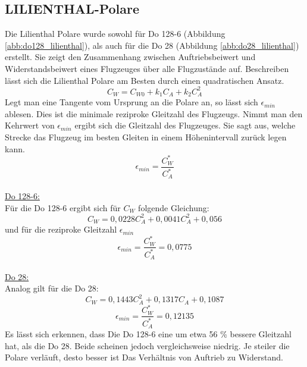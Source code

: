 \subsection{LILIENTHAL-Polare}
Die Lilienthal Polare wurde sowohl für Do 128-6 (Abbildung \ref{abb:do128_lilienthal}), als auch für die Do 28 (Abbildung \ref{abb:do28_lilienthal}) erstellt. Sie zeigt den Zusammenhang zwischen Auftriebsbeiwert und Widerstandsbeiwert eines Flugzeuges über alle Flugzustände auf. 
Beschreiben lässt sich die Lilienthal Polare am Besten durch einen quadratischen Ansatz.
\begin{equation}  \label{eq:theorie_cw}
C_W = C_{W0} + k_1 C_A + k_2 C_A^2
\end{equation}
Legt man eine Tangente vom Ursprung an die Polare an, so lässt sich $\epsilon_{min}$ ablesen. Dies ist die minimale reziproke Gleitzahl des Flugzeugs. Nimmt man den Kehrwert von $\epsilon_{min}$ ergibt sich die Gleitzahl des Flugzeuges. Sie sagt aus, welche Strecke das Flugzeug im besten Gleiten in einem Höhenintervall zurück legen kann. 
\begin{equation}
\epsilon_{min}=\frac{C_W^*}{C_A^*}
\end{equation} \\
\underline{Do 128-6:} \\
Für die Do 128-6 ergibt sich für $C_W$ folgende Gleichung:
\begin{equation}
C_W=0,0228 C_A^2 + 0,0041 C_A^2+ 0,056
\end{equation}
und für die reziproke Gleitzahl $\epsilon_{min}$
\begin{equation}
\epsilon_{min}=\frac{C_W^*}{C_A^*}=0,0775
\end{equation}
 \\
\underline{Do 28:} \\
Analog gilt für die Do 28:
\begin{equation}
C_W=0,1443C_{A}^2+0,1317C_A+0,1087
\end{equation}
\begin{equation}
\epsilon_{min}=\frac{C_W^*}{C_A^*}=0,12135
\end{equation}
Es lässt sich erkennen, dass Die Do 128-6 eine um etwa 56 \% bessere Gleitzahl hat, als die Do 28. Beide scheinen jedoch vergleichsweise niedrig. 
Je steiler die Polare verläuft, desto besser ist Das Verhältnis von Auftrieb zu Widerstand.
\\\\
